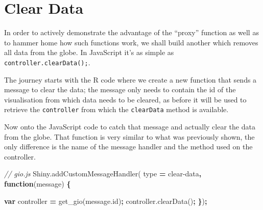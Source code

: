 \documentclass[
  10pt,
]{krantz}
\makeatletter
\newenvironment{Shaded}{\begin{snugshade}}{\end{snugshade}}
\newcommand{\AttributeTok}[1]{\textcolor[rgb]{0.61,0.61,0.61}{#1}}
\newcommand{\CommentTok}[1]{\textcolor[rgb]{0.37,0.37,0.37}{\textit{#1}}}
\newcommand{\ControlFlowTok}[1]{\textcolor[rgb]{0.27,0.27,0.27}{\textbf{#1}}}
\newcommand{\DataTypeTok}[1]{\textcolor[rgb]{0.27,0.27,0.27}{#1}}
\newcommand{\KeywordTok}[1]{\textcolor[rgb]{0.27,0.27,0.27}{\textbf{#1}}}
\newcommand{\NormalTok}[1]{#1}
\newcommand{\OperatorTok}[1]{\textcolor[rgb]{0.43,0.43,0.43}{\textbf{#1}}}
\newcommand{\StringTok}[1]{\textcolor[rgb]{0.5,0.5,0.5}{#1}}
\newcommand{\VariableTok}[1]{\textcolor[rgb]{0,0,0}{#1}}
\newenvironment{kframe}{%
\medskip{}
\setlength{\fboxsep}{.8em}
 \def\at@end@of@kframe{}%
 \ifinner\ifhmode%
  \def\at@end@of@kframe{\end{minipage}}%
  \begin{minipage}{\columnwidth}%
 \fi\fi%
 \def\FrameCommand##1{\hskip\@totalleftmargin \hskip-\fboxsep
 \colorbox{shadecolor}{##1}\hskip-\fboxsep
     \hskip-\linewidth \hskip-\@totalleftmargin \hskip\columnwidth}%
 \MakeFramed {\advance\hsize-\width
   \@totalleftmargin\z@ \linewidth\hsize
   \@setminipage}}%
 {\par\unskip\endMakeFramed%
 \at@end@of@kframe}
\renewenvironment{Shaded}{\begin{kframe}}{\end{kframe}}
\makeatother
\begin{document}
\hypertarget{shiny-widgets-clear-data}{%
\section{Clear Data}\label{shiny-widgets-clear-data}}

In order to actively demonstrate the advantage of the ``proxy'' function as well as to hammer home how such functions work, we shall build another which removes all data from the globe. In JavaScript it's as simple as \texttt{controller.clearData();}.

The journey starts with the R code where we create a new function that sends a message to clear the data; the message only needs to contain the id of the visualisation from which data needs to be cleared, as before it will be used to retrieve the \texttt{controller} from which the \texttt{clearData} method is available.

\begin{Shaded}
\end{Shaded}

Now onto the JavaScript code to catch that message and actually clear the data from the globe. That function is very similar to what was previously shown, the only difference is the name of the message handler and the method used on the controller.

\begin{Shaded}
\begin{Highlighting}[]
\CommentTok{// gio.js}
\VariableTok{Shiny}\NormalTok{.}\AttributeTok{addCustomMessageHandler}\NormalTok{(}
\NormalTok{  type }\OperatorTok{=} \StringTok{\textquotesingle{}clear{-}data\textquotesingle{}}\OperatorTok{,} \KeywordTok{function}\NormalTok{(message) }\OperatorTok{\{}

    \KeywordTok{var}\NormalTok{ controller }\OperatorTok{=} \AttributeTok{get\_gio}\NormalTok{(}\VariableTok{message}\NormalTok{.}\AttributeTok{id}\NormalTok{)}\OperatorTok{;}
    \VariableTok{controller}\NormalTok{.}\AttributeTok{clearData}\NormalTok{()}\OperatorTok{;}
\OperatorTok{\}}\NormalTok{)}\OperatorTok{;}
\end{Highlighting}
\end{Shaded}
\end{document}

